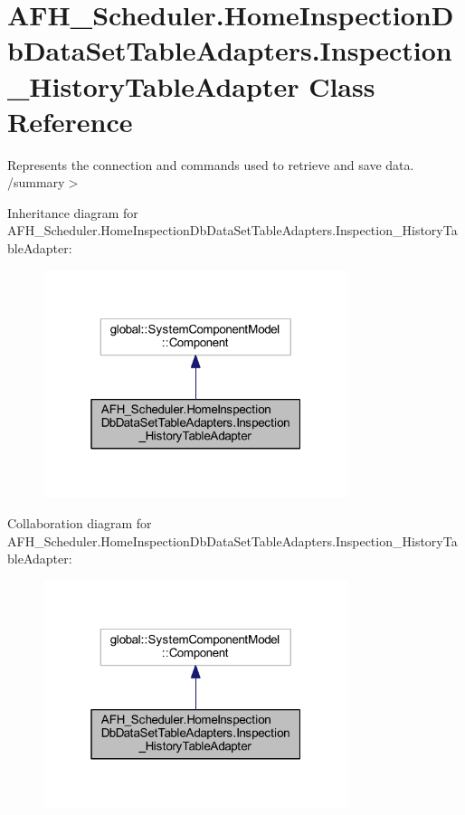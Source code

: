 \section{A\+F\+H\+\_\+\+Scheduler.\+Home\+Inspection\+Db\+Data\+Set\+Table\+Adapters.\+Inspection\+\_\+\+History\+Table\+Adapter Class Reference}
\label{class_a_f_h___scheduler_1_1_home_inspection_db_data_set_table_adapters_1_1_inspection___history_table_adapter}


Represents the connection and commands used to retrieve and save data. /summary$>$  




Inheritance diagram for A\+F\+H\+\_\+\+Scheduler.\+Home\+Inspection\+Db\+Data\+Set\+Table\+Adapters.\+Inspection\+\_\+\+History\+Table\+Adapter\+:
\nopagebreak
\begin{figure}[H]
\begin{center}
\leavevmode
\includegraphics[width=253pt]{class_a_f_h___scheduler_1_1_home_inspection_db_data_set_table_adapters_1_1_inspection___history_table_adapter__inherit__graph}
\end{center}
\end{figure}


Collaboration diagram for A\+F\+H\+\_\+\+Scheduler.\+Home\+Inspection\+Db\+Data\+Set\+Table\+Adapters.\+Inspection\+\_\+\+History\+Table\+Adapter\+:
\nopagebreak
\begin{figure}[H]
\begin{center}
\leavevmode
\includegraphics[width=253pt]{class_a_f_h___scheduler_1_1_home_inspection_db_data_set_table_adapters_1_1_inspection___history_table_adapter__coll__graph}
\end{center}
\end{figure}
